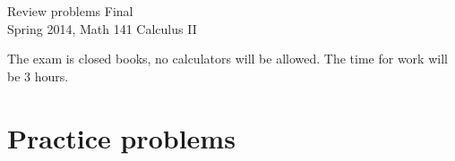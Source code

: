 \documentclass{article}
\begin{document}
\begin{center}
\Large
Review problems Final\\ Spring 2014, Math 141 Calculus II \\
\end{center}


\noindent The exam is closed books, no calculators will be allowed. The time for work will be 3 hours.
\section{Practice problems}
\end{document}
